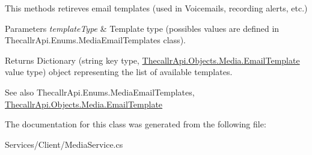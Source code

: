 This methods retireves email templates (used in Voicemails, recording alerts, etc.) 


\begin{DoxyParams}{Parameters}
{\em template\+Type} & Template type (possibles values are defined in Thecallr\+Api.\+Enums.\+Media\+Email\+Templates class).\\
\hline
\end{DoxyParams}
\begin{DoxyReturn}{Returns}
Dictionary (string key type, \hyperlink{class_thecallr_api_1_1_objects_1_1_media_1_1_email_template}{Thecallr\+Api.\+Objects.\+Media.\+Email\+Template} value type) object representing the list of available templates.
\end{DoxyReturn}
\begin{DoxySeeAlso}{See also}
Thecallr\+Api.\+Enums.\+Media\+Email\+Templates, \hyperlink{class_thecallr_api_1_1_objects_1_1_media_1_1_email_template}{Thecallr\+Api.\+Objects.\+Media.\+Email\+Template}


\end{DoxySeeAlso}


The documentation for this class was generated from the following file\+:\begin{DoxyCompactItemize}
\item 
Services/\+Client/Media\+Service.\+cs\end{DoxyCompactItemize}
